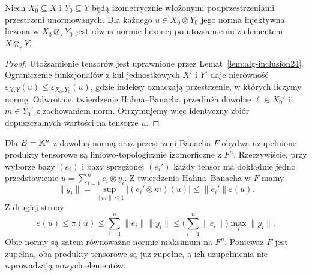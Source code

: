 \begin{twierdzenie}
\label{thm:eps-injective24}
Niech $X_0\subseteq X$ i $Y_0\subseteq Y$ będą izometrycznie
włożonymi podprzestrzeniami przestrzeni unormowanych.
Dla każdego $u\in X_0\otimes Y_0$ jego norma injektywna
liczona w $X_0\otimes_\varepsilon Y_0$ jest równa normie
liczonej po utożsamieniu z elementem $X\otimes_\varepsilon Y$.
\end{twierdzenie}
\begin{proof}
Utożsamienie tensorów jest uprawnione przez
Lemat~\ref{lem:alg-inclusion24}.
Ograniczenie funkcjonałów z kul jednostkowych $X'$ i $Y'$
daje nierówność $\varepsilon_{X,Y}(u)\le
\varepsilon_{X_0,Y_0}(u)$, gdzie indeksy oznaczają
przestrzenie, w których liczymy normę. Odwrotnie, twierdzenie
Hahna--Banacha przedłuża dowolne $\ell\in X_0'$
i $m\in Y_0'$ z zachowaniem norm. Otrzymujemy więc
identyczny zbiór dopuszczalnych wartości na tensorze $u$.
\end{proof}

\begin{przyklad}
\label{ex:finite-dim24}
Dla $E=\mathbb K^n$ z dowolną normą oraz przestrzeni Banacha $F$
obydwa uzupełnione produkty tensorowe są liniowo-topologicznie
izomorficzne z $F^n$. Rzeczywiście, przy wyborze bazy
$(e_i)$ i bazy sprzężonej $(e_i')$ każdy tensor ma dokładnie
jedno przedstawienie $u=\sum_{i=1}^ne_i\otimes y_i$.
Z twierdzenia Hahna--Banacha w $F$ mamy
\[
 \|y_i\|=\sup_{\|m\|\le1}|(e_i'\otimes m)(u)|
 \le\|e_i'\|\varepsilon(u).
\]
Z drugiej strony
\[
 \varepsilon(u)\le\pi(u)\le\sum_{i=1}^n\|e_i\|\|y_i\|
 \le\Big(\sum_{i=1}^n\|e_i\|\Big)\max_i\|y_i\|.
\]
Obie normy są zatem równoważne normie maksimum na $F^n$.
Ponieważ $F$ jest zupełna, oba produkty tensorowe są już
zupełne, a ich uzupełnienia nie wprowadzają nowych elementów.
\end{przyklad}


